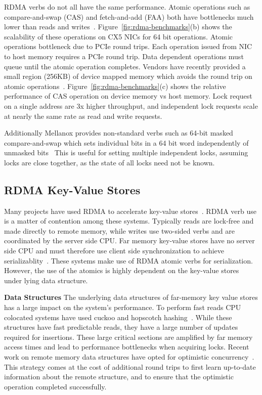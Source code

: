 RDMA verbs do not all have the same performance. Atomic
operations such as compare-and-swap (CAS) and fetch-and-add
(FAA) both have bottlenecks much lower than reads and
writes~\cite{design-guidelines,sherman}.
Figure~\ref{fig:rdma-benchmarks}(b) shows the scalability of
these operations on CX5 NICs for 64 bit operations.
Atomic operations bottleneck due to PCIe round trips. 
Each operation issued from NIC to host memory requires a
PCIe round trip. Data dependent operations must queue until
the atomic operation completes.
Vendors have recently provided a small region (256KB)
of device mapped memory which avoids the round trip on
atomic operations~\cite{device-memory}.
Figure~\ref{fig:rdma-benchmarks}(c) shows the relative
performance of CAS operation on device memory vs host
memory. Lock request on a single address are 3x higher
throughput, and independent lock requests scale at nearly
the same rate as read and write requests.

Additionally Mellanox provides non-standard verbs such as
64-bit masked compare-and-swap which sets individual bits in
a 64 bit word independently of unmasked
bits~\cite{rdma-masked-cas} This is useful for setting
multiple independent locks, assuming locks are close
together, as the state of all locks need not be known.


\subsection{RDMA Key-Value Stores}
Many projects have used RDMA to accelerate key-value
stores~\cite{farm,memc3,erpc,herd,faast,mica,pilaf,cell,storm}.
RDMA verb use is a matter of contention among these systems.
Typically reads are lock-free and made directly to remote
memory, while writes use two-sided verbs and are coordinated
by the server side CPU.
Far memory key-value stores have no server side CPU and must
therefore use client side synchronization to achieve
serializablity~\cite{rolex,fusee,clover,sherman,ford,race}.
These systems make use of RDMA atomic verbs for
serialization. However, the use of the atomics is highly
dependent on the key-value stores under lying data
structure.

\textbf{Data Structures} The underlying data structures of
far-memory key value stores has a large impact on the
system's performance. To perform fast reads CPU colocated
systems have used cuckoo and hopscotch
hashing~\cite{hopscotch,herd,pilaf,cuckoo}. While these
structures have fast predictable reads, they have a large
number of updates required for insertions. These large
critical sections are amplified by far memory access times
and lead to performance bottlenecks when acquiring locks.
Recent work on remote memory data structures have opted for
optimistic concurrency~\cite{rolex,fusee,clover,ford,race}.
This strategy comes at the cost of additional round trips to
first learn up-to-date information about the remote
structure, and to ensure that the optimistic operation
completed successfully.

